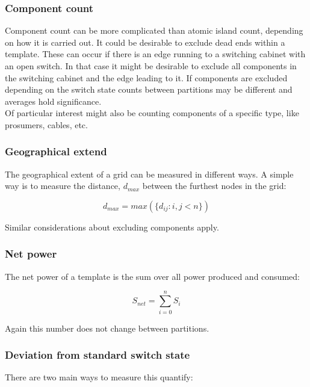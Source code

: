 \subsubsection{Component count}

Component count can be more complicated than atomic island count, depending on how
it is carried out. It could be desirable to exclude dead ends within a template.
These can occur if there is an edge running to a switching cabinet with an open switch. 
In that case it might be desirable to exclude all components in the switching cabinet
and the edge leading to it. If components are excluded depending on the switch state 
counts between partitions may be different and averages hold significance.\\
Of particular interest might
also be counting components of a specific type, like prosumers, cables, etc.

\subsubsection{Geographical extend}

The geographical extent of a grid can be measured in different ways. A simple way is to
measure the distance, $d_{max}$ between the furthest nodes in the grid:

\begin{equation}
  d_{max} = max(\{d_{ij} : i, j < n\})
  \label{eq:measures:geo_extend}
\end{equation}

Similar considerations about excluding components apply.

\subsubsection{Net power}

The net power of a template is the sum over all power produced and consumed:

\begin{equation}
  S_{net} = \sum_{i = 0}^n S_i
\end{equation}

Again this number does not change between partitions.

\subsubsection{Deviation from standard switch state}

There are two main ways to measure this quantify:

